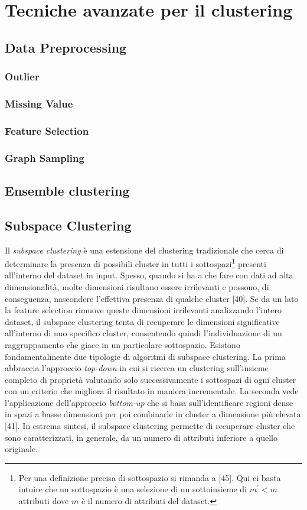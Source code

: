 \section{Tecniche avanzate per il clustering}
\subsection{Data Preprocessing}
\subsubsection{Outlier}
\subsubsection{Missing Value}
\subsubsection{Feature Selection}
\subsubsection{Graph Sampling}

\subsection{Ensemble clustering}
\subsection{Subspace Clustering}
\label{subsec:subspace_clustering}
Il \textit{subspace clustering} \`e una estensione del clustering tradizionale che cerca di determinare la presenza di possibili cluster in tutti i sottospazi\footnote{Per una definizione precisa di sottospazio si rimanda a [45]. Qui ci basta intuire che un sottospazio \`e una selezione di un sottoinsieme di $ m^{'} < m $ attributi dove $ m $ \`e il numero di attributi del dataset.} presenti all'interno del dataset in input. 
Spesso, quando si ha a che fare con dati ad alta dimensionalit\`a, molte dimensioni risultano essere irrilevanti e possono, di conseguenza, nascondere l'effettiva presenza di qualche cluster [40]. Se da un lato la feature selection rimuove queste dimensioni irrilevanti analizzando l'intero dataset, il subspace clustering tenta di recuperare le dimensioni significative all'interno di uno specifico cluster, consentendo quindi l'individuazione di un raggruppamento che giace in un particolare sottospazio. Esistono fondamentalmente due tipologie di algoritmi di subspace clustering. La prima abbraccia l'approccio \textit{top-down} in cui si ricerca un clustering sull'insieme completo di propriet\`a valutando solo successivamente i sottospazi di ogni cluster con un criterio che migliora il risultato in maniera incrementale. La seconda vede l'applicazione dell'approccio \textit{bottom-up} che si basa sull'identificare regioni dense in spazi a basse dimensioni per poi combinarle in cluster a dimensione pi\`u elevata [41]. In estrema sintesi, il subspace clustering permette di recuperare cluster che sono caratterizzati, in generale, da un numero di attributi inferiore a quello originale. 

